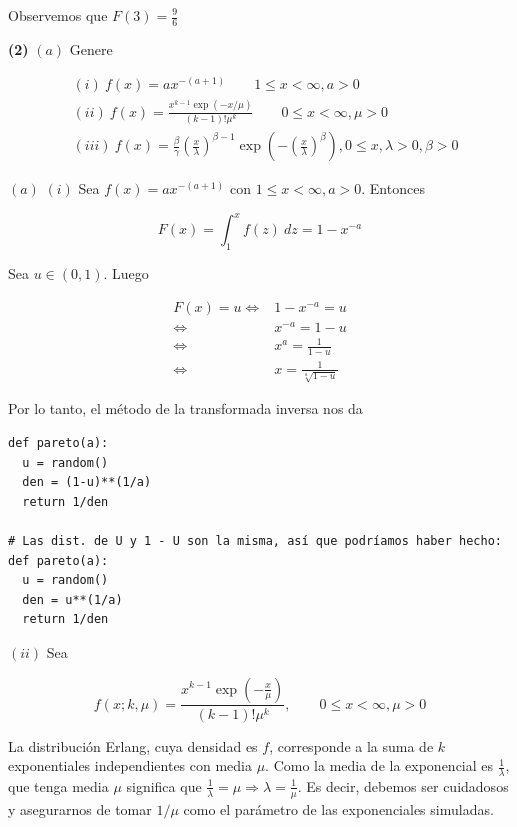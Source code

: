 \documentclass[a4paper, 12pt]{article}
\begin{document}
Observemos que $F(3) = \frac{9}{6}$

\pagebreak

\begin{myframe}
  \textbf{(2)} $(a)$ Genere 

  \begin{align*}
    &(i) ~ f(x) = ax^{-(a+1)} \qquad 1 \leq x < \infty, a > 0 \\ 
    &(ii) ~ f(x) = \frac{ x^{k-1}\exp(-x / \mu) }{(k-1)!\mu^k} \qquad 0 \leq x <
    \infty, \mu > 0 \\ 
    &(iii) ~ f(x) = \frac{\beta}{\gamma}(\frac{x}{\lambda})^{\beta - 1}\exp\left(
    -\left( \frac{x}{\lambda} \right)^\beta \right), 0\leq x, \lambda > 0, \beta
    > 0
  \end{align*}
\end{myframe}

$(a)$ $(i)$ Sea $f(x) = ax^{-(a + 1)}$ con $1 \leq x < \infty, a > 0$. Entonces

\begin{equation*}
  F(x) = \int_1^x f(z) ~ dz 
  =1 - x^{-a}
\end{equation*}

Sea $u \in (0, 1)$. Luego

\begin{align*}
  F(x) = u 
  \iff &1- x^{-a} = u \\ 
  \iff&x^{-a} = 1 - u \\ 
  \iff&x^a = \frac{1}{1-u} \\ 
  \iff& x = \frac{1}{\sqrt[a]{1-u} }
\end{align*}

Por lo tanto, el método de la transformada inversa nos da

\footnotesize
\begin{verbatim}
def pareto(a):
  u = random()
  den = (1-u)**(1/a)
  return 1/den

# Las dist. de U y 1 - U son la misma, así que podríamos haber hecho:
def pareto(a):
  u = random()
  den = u**(1/a)
  return 1/den
\end{verbatim}

\normalsize

$(ii)$ Sea 

\begin{equation*}
  f(x; k, \mu) =  \frac{ x^{k-1}\exp\left( -\frac{x}{\mu} \right)  }{\left( k-1
  \right)!\mu^k }, \qquad 0 \leq x < \infty, \mu > 0
\end{equation*}

La distribución Erlang, cuya densidad es $f$, corresponde a la suma de $k$
exponentiales independientes con media $\mu$. Como la media de la exponencial es
$\frac{1}{\lambda}$, que tenga media $\mu$ significa que $\frac{1}{\lambda} =
\mu \Rightarrow \lambda = \frac{1}{\mu}$. Es decir, debemos ser cuidadosos y
asegurarnos de tomar $1 / \mu$ como el parámetro de las exponenciales simuladas.
\end{document}
